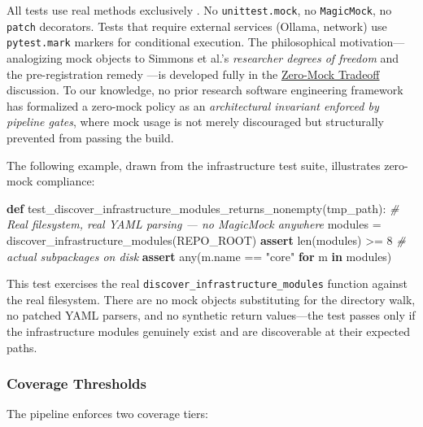 \documentclass[
]{article}
\newenvironment{Shaded}{}{}
\newcommand{\BuiltInTok}[1]{\textcolor[rgb]{0.00,0.50,0.00}{#1}}
\newcommand{\CommentTok}[1]{\textcolor[rgb]{0.38,0.63,0.69}{\textit{#1}}}
\newcommand{\ControlFlowTok}[1]{\textcolor[rgb]{0.00,0.44,0.13}{\textbf{#1}}}
\newcommand{\DecValTok}[1]{\textcolor[rgb]{0.25,0.63,0.44}{#1}}
\newcommand{\KeywordTok}[1]{\textcolor[rgb]{0.00,0.44,0.13}{\textbf{#1}}}
\newcommand{\NormalTok}[1]{#1}
\newcommand{\OperatorTok}[1]{\textcolor[rgb]{0.40,0.40,0.40}{#1}}
\newcommand{\StringTok}[1]{\textcolor[rgb]{0.25,0.44,0.63}{#1}}
\newcounter{none} %
\begin{document}
All tests use real methods exclusively
\citep{martin2008clean, meszaros2007xunit}. No \texttt{unittest.mock},
no \texttt{MagicMock}, no \texttt{patch} decorators. Tests that require
external services (Ollama, network) use \texttt{pytest.mark} markers for
conditional execution. The philosophical motivation---analogizing mock
objects to Simmons et al.'s \emph{researcher degrees of freedom}
\citep{simmons2011falsepositive} and the pre-registration remedy
\citep{nosek2018preregistration}---is developed fully in the
\href{05a_zeromock_tradeoff.md\#the-zero-mock-tradeoff}{Zero-Mock
Tradeoff} discussion. To our knowledge, no prior research software
engineering framework has formalized a zero-mock policy as an
\emph{architectural invariant enforced by pipeline gates}, where mock
usage is not merely discouraged but structurally prevented from passing
the build.

The following example, drawn from the infrastructure test suite,
illustrates zero-mock compliance:

\begin{Shaded}
\begin{Highlighting}[]
\KeywordTok{def}\NormalTok{ test\_discover\_infrastructure\_modules\_returns\_nonempty(tmp\_path):}
    \CommentTok{\# Real filesystem, real YAML parsing — no MagicMock anywhere}
\NormalTok{    modules }\OperatorTok{=}\NormalTok{ discover\_infrastructure\_modules(REPO\_ROOT)}
    \ControlFlowTok{assert} \BuiltInTok{len}\NormalTok{(modules) }\OperatorTok{\textgreater{}=} \DecValTok{8}           \CommentTok{\# actual subpackages on disk}
    \ControlFlowTok{assert} \BuiltInTok{any}\NormalTok{(m.name }\OperatorTok{==} \StringTok{"core"} \ControlFlowTok{for}\NormalTok{ m }\KeywordTok{in}\NormalTok{ modules)}
\end{Highlighting}
\end{Shaded}

This test exercises the real \texttt{discover\_infrastructure\_modules}
function against the real filesystem. There are no mock objects
substituting for the directory walk, no patched YAML parsers, and no
synthetic return values---the test passes only if the infrastructure
modules genuinely exist and are discoverable at their expected paths.

\subsubsection{Coverage Thresholds}\label{coverage-thresholds}

The pipeline enforces two coverage tiers:
\end{document}
